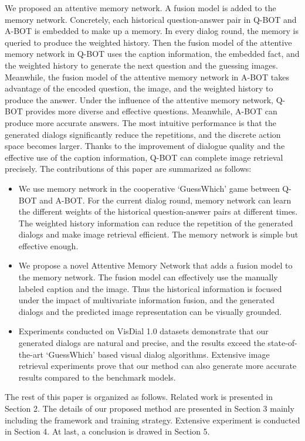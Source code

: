 \documentclass[review]{elsarticle}
\begin{document}
	We proposed an attentive memory network. A fusion model is added to the memory network. Concretely, each historical question-answer pair in Q-BOT and A-BOT is embedded to make up a memory. In every dialog round, the memory is queried to produce the weighted history. Then the fusion model of the attentive memory network in Q-BOT uses the caption information, the embedded fact, and the weighted history to generate the next question and the guessing images. Meanwhile, the fusion model of the attentive memory network in A-BOT takes advantage of the encoded question, the image, and the weighted history to produce the answer. Under the influence of the attentive memory network, Q-BOT provides more diverse and effective questions. Meanwhile, A-BOT can produce more accurate answers. The most intuitive performance is that the generated dialogs significantly reduce the repetitions, and the discrete action space becomes larger. Thanks to the improvement of dialogue quality and the effective use of the caption information, Q-BOT can complete image retrieval precisely. 
	The contributions of this paper are summarized as follows: 
	\begin{itemize}
		\item We use memory network in the cooperative `GuessWhich' game between Q-BOT and A-BOT. For the current dialog round, memory network can learn the different weights of the historical question-answer pairs at different times. The weighted history information can reduce the repetition of the generated dialogs and make image retrieval efficient. The memory network is simple but effective enough.
		\item We propose a novel Attentive Memory Network that adds a fusion model to the memory network. The fusion model can effectively use the manually labeled caption and the image.  Thus the historical information is focused under the impact of multivariate information fusion, and the generated dialogs and the predicted image representation can be visually grounded.
		\item Experiments conducted on VisDial 1.0 datasets demonstrate that our generated dialogs are natural and precise, and the results exceed the state-of-the-art `GuessWhich' based visual dialog algorithms. Extensive image retrieval experiments prove that our method  can also generate more accurate results compared to the benchmark models.
	\end{itemize} 
	
	The rest of this paper is organized as follows. Related work is presented in Section 2. The details of our proposed method are presented in Section 3 mainly including the framework and training strategy. Extensive experiment is conducted in Section 4. At last, a conclusion is drawed in Section 5.
	
\end{document}
